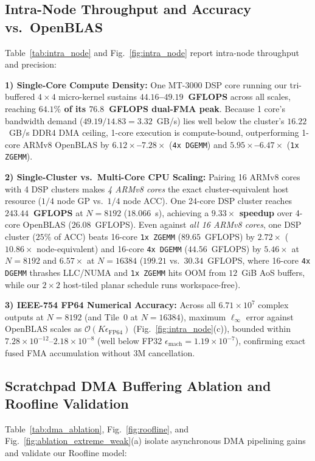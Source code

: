 \documentclass[conference]{IEEEtran}
\begin{document}
\subsection{Intra-Node Throughput and Accuracy vs.\ OpenBLAS}
Table~\ref{tab:intra_node} and Fig.~\ref{fig:intra_node} report intra-node throughput and precision:

\textbf{1) Single-Core Compute Density:} One MT-3000 DSP core running our tri-buffered $4 \times 4$ micro-kernel sustains \textbf{$44.16$--$49.19$~GFLOPS} across all scales, reaching \textbf{$64.1\%$ of its $76.8$~GFLOPS dual-FMA peak}. Because 1 core's bandwidth demand ($49.19 / 14.83 = 3.32$~GB/s) lies well below the cluster's $16.22$~GB/s DDR4 DMA ceiling, 1-core execution is compute-bound, outperforming 1-core ARMv8 OpenBLAS by \textbf{$6.12\times$--$7.28\times$} (\texttt{4x DGEMM}) and \textbf{$5.95\times$--$6.47\times$} (\texttt{1x ZGEMM}).

\textbf{2) Single-Cluster vs.\ Multi-Core CPU Scaling:} Pairing 16 ARMv8 cores with 4 DSP clusters makes \emph{4 ARMv8 cores} the exact cluster-equivalent host resource ($1/4$ node GP vs.\ $1/4$ node ACC). One 24-core DSP cluster reaches \textbf{$243.44$~GFLOPS} at $N=8192$ ($18.066$~s), achieving a \textbf{$9.33\times$ speedup} over 4-core OpenBLAS ($26.08$~GFLOPS). Even against \emph{all 16 ARMv8 cores}, one DSP cluster ($25\%$ of ACC) beats 16-core \texttt{1x ZGEMM} ($89.65$~GFLOPS) by \textbf{$2.72\times$} ($10.86\times$ node-equivalent) and 16-core \texttt{4x DGEMM} ($44.56$~GFLOPS) by \textbf{$5.46\times$} at $N=8192$ and \textbf{$6.57\times$} at $N=16384$ ($199.21$ vs.\ $30.34$~GFLOPS, where 16-core \texttt{4x DGEMM} thrashes LLC/NUMA and \texttt{1x ZGEMM} hits OOM from $12$~GiB AoS buffers, while our $2 \times 2$ host-tiled planar schedule runs workspace-free).

\textbf{3) IEEE-754 FP64 Numerical Accuracy:} Across all $6.71 \times 10^7$ complex outputs at $N=8192$ (and Tile~0 at $N=16384$), maximum $\ell_\infty$ error against OpenBLAS scales as $\mathcal{O}(K \epsilon_{\mathrm{FP64}})$ (Fig.~\ref{fig:intra_node}(c)), bounded within $7.28 \times 10^{-12}$--$2.18 \times 10^{-8}$ (well below FP32 $\epsilon_{\mathrm{mach}} = 1.19 \times 10^{-7}$), confirming exact fused FMA accumulation without 3M cancellation.

\subsection{Scratchpad DMA Buffering Ablation and Roofline Validation}
Table~\ref{tab:dma_ablation}, Fig.~\ref{fig:roofline}, and Fig.~\ref{fig:ablation_extreme_weak}(a) isolate asynchronous DMA pipelining gains and validate our Roofline model:
\end{document}
